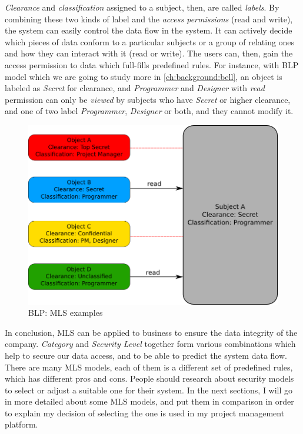 \emph{Clearance} and \emph{classification} assigned to a subject, then, are called \emph{labels}.
By combining these two kinds of label and the \emph{access permissions} (read and write), the system can easily control the data flow in the system.
It can actively decide which pieces of data conform to a particular subjects or a group of relating ones and how they can interact with it (read or write).
The users can, then, gain the access permission to data which full-fills predefined rules.
For instance, with BLP model which we are going to study more in \autoref{ch:background:bell}, an object is labeled as \emph{Secret} for clearance, and \emph{Programmer} and \emph{Designer} with \emph{read} permission can only be \emph{viewed} by subjects who have \emph{Secret} or higher clearance, and one of two label \emph{Programmer}, \emph{Designer} or both, and they cannot modify it.

\begin{figure}[bth]                                                                                                                                                  
\myfloatalign
\includegraphics[width=1.0\linewidth]{gfx/chapter_2/mls_example}
\caption[BLP: MLS examples]{BLP: MLS examples}\label{fig:mls_example}
\end{figure}

In conclusion, MLS can be applied to business to ensure the data integrity of the company.
\emph{Category} and \emph{Security Level} together form various combinations which help to secure our data access, and to be able to predict the system data flow.
There are many MLS models, each of them is a different set of predefined rules, which has different pros and cons.
People should research about security models to select or adjust a suitable one for their system. 
In the next sections, I will go in more detailed about some MLS models, and put them in comparison in order to explain my decision of selecting the one is used in my project management platform.

